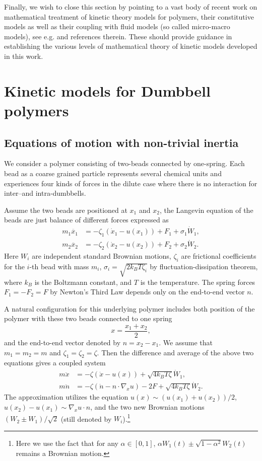 \documentclass[reqno]{amsart}
\numberwithin{equation}{section}
\theoremstyle{definition}
\theoremstyle{remark}
\begin{document}
Finally, we wish to close this section by pointing to a vast body of
recent work on mathematical treatment of kinetic theory models for
polymers,  their constitutive models as well as their coupling with
fluid models (so called micro-macro models), see e.g.
\cite{Rm91,DLP02,ELZ02,CKT04,CKT04+,ELZ04,JLL04,Cp05,CTV05,
CV05,FS05,DLY05,LZZ05,EZ06,JLO06,ZZ06,CFTZ07,Li07,LLZ07,LM07,CM08,LL08,LL08+,LZ08,M08,OT08,
ZWFW05,ZZZ08} and references therein. These should  provide guidance
in establishing the various levels of mathematical theory of kinetic
models developed in this work.



\section{Kinetic models for Dumbbell polymers }
\subsection{Equations of motion with non-trivial inertia}

We consider a polymer consisting of two-beads connected by one-spring.
Each bead as a coarse grained particle represents several chemical units and experiences four
kinds of forces in the dilute case where there is no interaction for inter--and intra-dumbbells.

Assume the two beads are positioned at $x_1$ and $x_2$, the Langevin equation of the beads are just balance of different forces expressed as
\begin{align*}
m_1\ddot{x_1} &=-\zeta_1(\dot x_1 -u(x_1))+F_1 +\sigma_1 \dot W_1,\\
m_2\ddot{x_2} &=-\zeta_2(\dot x_2 -u(x_2))+F_2 +\sigma_2 \dot W_2.
\end{align*}
Here $W_i$ are independent standard Brownian motions, $\zeta_i$ are frictional coefficients for the $i$-th bead with mass $m_i$, $\sigma_i=\sqrt{2k_BT\zeta_i}$ by fluctuation-dissipation theorem, where $k_B$ is the Boltzmann
constant, and $T$ is the temperature. The spring forces $F_1=-F_2=F$ by Newton's Third Law
depends only on the end-to-end vector $n$.

A natural configuration for this underlying polymer includes both
position of the polymer with these two beads connected to one spring
$$
x=\frac{x_1+x_2}{2},
$$
and the end-to-end vector denoted by $n=x_2-x_1$. We assume that $m_1=m_2=m$ and $\zeta_1=\zeta_2=\zeta$. Then the difference  and average of the above two equations gives a coupled system
\begin{align}\label{2.1}
m\ddot {x} & =-\zeta(\dot x-u(x))+\sqrt{4k_BT\zeta}\dot W_1,\\ \label{2.2}
 m\ddot {n} &=-\zeta(\dot n-n \cdot \nabla_x u)-2F+\sqrt{4k_BT\zeta}\dot W_2.
\end{align}
The approximation utilizes the equation $u(x)\sim (u(x_1)+u(x_2))/2$, $u(x_2)-u(x_1) \sim \nabla_x u \cdot n$, and the two new Brownian motions
$
(W_2 \pm W_1)/\sqrt{2}
$
(still denoted by $W_i$).\footnote{Here we use the fact that for any $\alpha \in[0, 1]$, $\alpha W_1(t)\pm
\sqrt{1-\alpha^2}W_2(t)$ remains a Brownian motion.}
\end{document}
